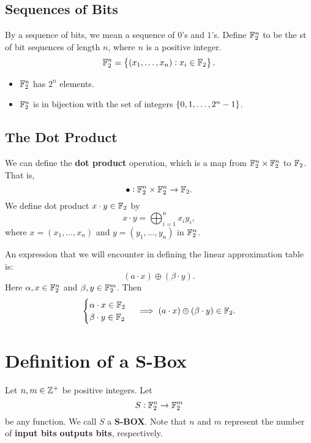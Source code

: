 \newpage
\subsection{Sequences of Bits}
By a sequence of bits, we mean a sequence of $0$'s and $1$'s. Define $\mathbb{F}_2^n$ to be the st of bit sequences of length $n$, where $n$ is a positive integer. \[
\mathbb{F}_2^n=\set{(x_1,\dots,x_n): x_i\in\mathbb{F}_2}.
\]
\begin{tcolorbox}
\begin{itemize}
	\item $\mathbb{F}_2^n$ has $2^n$ elements.
	\item $\mathbb{F}_2^n$ is in bijection with the set of integers $\set{0,1,\dots,2^n-1}$.
\end{itemize}
\end{tcolorbox}

\subsection{The Dot Product}
We can define the \textbf{dot product} operation, which is a map from $\mathbb{F}_2^n\times\mathbb{F}_2^n$ to $\mathbb{F}_2$. That is, \[
\bullet:\mathbb{F}_2^n\times\mathbb{F}_2^n\to\mathbb{F}_2.
\] We define dot product $x\cdot y\in\mathbb{F}_2$ by \[
x\cdot y=\bigoplus_{i=1}^nx_iy_i,
\] where $x=(x_1,\dots,x_n)$ and $y=(y_1,\dots,y_n)$ in $\mathbb{F}_2^n$.

An expression that we will encounter in defining the linear approximation table is: \[
(a\cdot x)\oplus(\beta\cdot y).
\] Here $\alpha,x\in\mathbb{F}_2^n$ and $\beta,y\in\mathbb{F}_2^{m}$. Then
\begin{align*}
\begin{cases}
\alpha\cdot x\in\mathbb{F}_2\\
\beta\cdot y\in\mathbb{F}_2
\end{cases}\implies
(a\cdot x)\oplus(\beta\cdot y)\in\mathbb{F}_2.
\end{align*}
\vspace{12pt}
\section{Definition of a S-Box}
\begin{tcolorbox}[colback=white,colframe=defcolor,arc=5pt,title={\color{white}\bf S-BOX}]
\begin{definition}
	Let $n,m\in\mathbb{Z}^+$ be positive integers. Let $$
	S:\mathbb{F}_2^n\to\mathbb{F}_2^m
	$$ be any function. We call $S$ a \textbf{S-BOX}. Note that $n$ and $m$ represent the number of \textbf{input bits} \textbf{outputs bits}, respectively.
\end{definition}
\end{tcolorbox}
\newpage

